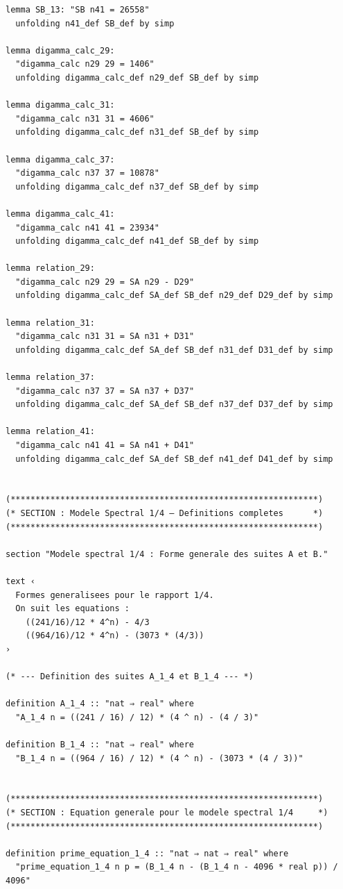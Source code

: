 \documentclass[a4paper,11pt]{article}
\begin{document}
\begin{holcode}[title={\textcolor{white}{Fichier : methode\_spectral.thy -- Partie 1/4}}]
\begin{lstlisting}
lemma SB_13: "SB n41 = 26558"
  unfolding n41_def SB_def by simp

lemma digamma_calc_29:
  "digamma_calc n29 29 = 1406"
  unfolding digamma_calc_def n29_def SB_def by simp

lemma digamma_calc_31:
  "digamma_calc n31 31 = 4606"
  unfolding digamma_calc_def n31_def SB_def by simp

lemma digamma_calc_37:
  "digamma_calc n37 37 = 10878"
  unfolding digamma_calc_def n37_def SB_def by simp

lemma digamma_calc_41:
  "digamma_calc n41 41 = 23934"
  unfolding digamma_calc_def n41_def SB_def by simp

lemma relation_29:
  "digamma_calc n29 29 = SA n29 - D29"
  unfolding digamma_calc_def SA_def SB_def n29_def D29_def by simp

lemma relation_31:
  "digamma_calc n31 31 = SA n31 + D31"
  unfolding digamma_calc_def SA_def SB_def n31_def D31_def by simp

lemma relation_37:
  "digamma_calc n37 37 = SA n37 + D37"
  unfolding digamma_calc_def SA_def SB_def n37_def D37_def by simp

lemma relation_41:
  "digamma_calc n41 41 = SA n41 + D41"
  unfolding digamma_calc_def SA_def SB_def n41_def D41_def by simp


(**************************************************************)
(* SECTION : Modele Spectral 1/4 – Definitions completes      *)
(**************************************************************)

section "Modele spectral 1/4 : Forme generale des suites A et B."

text ‹
  Formes generalisees pour le rapport 1/4.
  On suit les equations :
    ((241/16)/12 * 4^n) - 4/3
    ((964/16)/12 * 4^n) - (3073 * (4/3))
›

(* --- Definition des suites A_1_4 et B_1_4 --- *)

definition A_1_4 :: "nat ⇒ real" where
  "A_1_4 n = ((241 / 16) / 12) * (4 ^ n) - (4 / 3)"

definition B_1_4 :: "nat ⇒ real" where
  "B_1_4 n = ((964 / 16) / 12) * (4 ^ n) - (3073 * (4 / 3))"


(**************************************************************)
(* SECTION : Equation generale pour le modele spectral 1/4     *)
(**************************************************************)

definition prime_equation_1_4 :: "nat ⇒ nat ⇒ real" where
  "prime_equation_1_4 n p = (B_1_4 n - (B_1_4 n - 4096 * real p)) / 4096"


\end{lstlisting}
\end{holcode}
\end{document}

